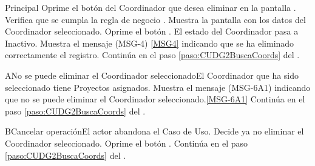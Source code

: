 	\begin{UCtrayectoria}{Principal}
			\UCpaso[\UCactor] Oprime el botón  del Coordinador que desea eliminar en la pantalla .
			\UCpaso Verifica que se cumpla la regla de negocio . %
			\UCpaso Muestra la pantalla  con los datos del Coordinador seleccionado. 
			\UCpaso [\UCactor] Oprime el botón . 
			\UCpaso El estado del Coordinador pasa a Inactivo.
			\UCpaso Muestra el mensaje (MSG-4) \ref{MSG4} indicando que se ha eliminado correctamente el registro.
			\UCpaso Continúa en el paso \ref{paso:CUDG2BuscaCoords} del .
	\end{UCtrayectoria}

		\begin{UCtrayectoriaA}{A}{No se puede eliminar el Coordinador seleccionado}{El Coordinador que ha sido seleccionado tiene Proyectos asignados.}
			\UCpaso Muestra el mensaje (MSG-6A1) indicando que no se puede eliminar el Coordinador seleccionado.\ref{MSG-6A1}
			\UCpaso Continúa en el paso \ref{paso:CUDG2BuscaCoords} del .
		\end{UCtrayectoriaA}

		\begin{UCtrayectoriaA}{B}{Cancelar operación}{El actor abandona el Caso de Uso.}
			\UCpaso[\UCactor] Decide ya no eliminar el Coordinador seleccionado.
			\UCpaso[\UCactor] Oprime el botón .
			\UCpaso Continúa en el paso \ref{paso:CUDG2BuscaCoords} del .
		\end{UCtrayectoriaA}

